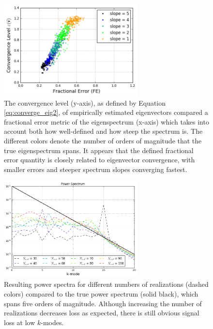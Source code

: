 \begin{figure}
    \centering
	\includegraphics[width=0.65\textwidth]{plots/eigchar_1.png}    
	\caption{The convergence level (y-axis), as defined by Equation \eqref{eq:converge_eig2}, of empirically estimated eigenvectors compared a fractional error metric of the eigenspectrum (x-axis) which takes into account both how well-defined and how steep the spectrum is. The different colors denote the number of orders of magnitude that the true eigenspectrum spans. It appears that the defined fractional error quantity is closely related to eigenvector convergence, with smaller errors and steeper spectrum slopes converging fastest.}
    \label{fig:eigchar_1}
\end{figure}

\begin{figure}
    \centering
	\includegraphics[width=0.65\textwidth]{plots/eigchar_2.png}    
	\caption{Resulting power spectra for different numbers of realizations (dashed colors) compared to the true power spectrum (solid black), which spans five orders of magnitude. Although increasing the number of realizations decreases loss as expected, there is still obvious signal loss at low $k$-modes.}
    \label{fig:eigchar_2}
\end{figure}

